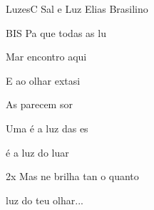 \documentclass[a4,12pt,oneside]{book}
\newcommand{\RevDate}{\today}
\newcommand{\NotCCLIed}{\relax}
\begin{document}
\begin{song}{Luzes}{C}
  {Sal e Luz}
  {Elias Brasilino}
  {}
  {\NotCCLIed}
  
	\renewcommand{\RevDate}{18 de junho de 2015}
 
	
	\ifChordBk	
		\vspace{-2em}\flushright{\Cchord \quad \Fchord \quad\Gchord \quad \Emchord}
		\vspace{-2ex}
	\fi
	
	\begin{SBVerse*}
		\begin{SBBracket}{BIS}
			Pa que todas as lu
	
			Mar encontro aqui
	
			E ao  olhar extasi
	
			As  parecem sor
	
			Uma  é a luz das es
	
			 é a luz do luar
	
			\begin{SBBracket}{2x}
					Mas ne brilha tan o quanto
			
					 luz do teu olhar...
			\end{SBBracket}
		\end{SBBracket}
	\end{SBVerse*}
\end{song}
\end{document}
